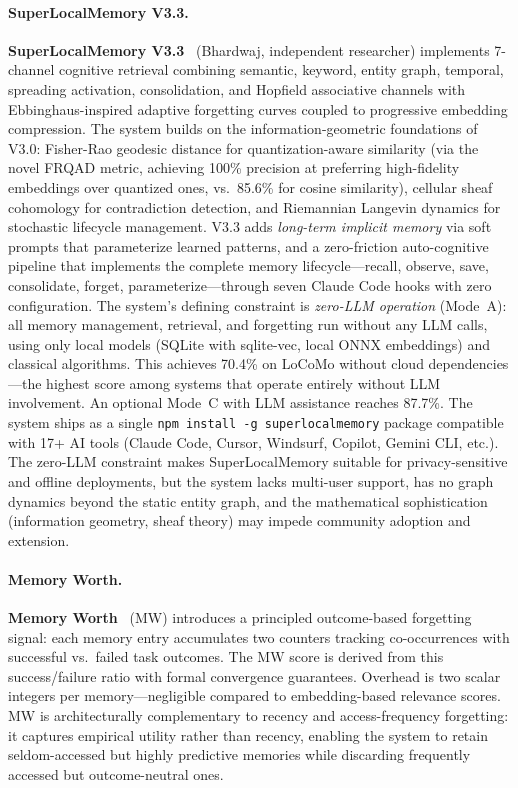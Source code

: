 \paragraph{SuperLocalMemory V3.3.}
\textbf{SuperLocalMemory V3.3}~\cite{superlocalmemory2026} (Bhardwaj,
independent researcher) implements 7-channel cognitive retrieval
combining semantic, keyword, entity graph, temporal, spreading
activation, consolidation, and Hopfield associative channels with
Ebbinghaus-inspired adaptive forgetting curves coupled to progressive
embedding compression.  The system builds on the information-geometric
foundations of V3.0: Fisher-Rao geodesic
distance for quantization-aware similarity (via the novel FRQAD metric,
achieving 100\% precision at preferring high-fidelity embeddings over
quantized ones, vs.\ 85.6\% for cosine similarity), cellular sheaf
cohomology for contradiction detection, and Riemannian Langevin dynamics
for stochastic lifecycle management.  V3.3 adds \emph{long-term implicit
memory} via soft prompts that parameterize learned patterns, and a
zero-friction auto-cognitive pipeline that implements the complete memory
lifecycle---recall, observe, save, consolidate, forget,
parameterize---through seven Claude Code hooks with zero configuration.
The system's defining constraint is \emph{zero-LLM operation} (Mode~A):
all memory management, retrieval, and forgetting run without any LLM
calls, using only local models (SQLite with sqlite-vec, local ONNX
embeddings) and classical algorithms.  This achieves 70.4\% on LoCoMo
without cloud dependencies---the highest score among systems that operate
entirely without LLM involvement.  An optional Mode~C with LLM
assistance reaches 87.7\%.  The system ships as a single
\texttt{npm install -g superlocalmemory} package compatible with 17+
AI tools (Claude Code, Cursor, Windsurf, Copilot, Gemini CLI, etc.).
The zero-LLM constraint makes SuperLocalMemory suitable for
privacy-sensitive and offline deployments, but the system lacks
multi-user support, has no graph dynamics beyond the static entity graph,
and the mathematical sophistication (information geometry, sheaf theory)
may impede community adoption and extension.

\paragraph{Memory Worth.}
\textbf{Memory Worth}~\cite{memoryworth2026} (MW) introduces a
principled outcome-based forgetting signal: each memory entry
accumulates two counters tracking co-occurrences with successful
vs.\ failed task outcomes.  The MW score is derived from this
success/failure ratio with formal convergence guarantees.  Overhead
is two scalar integers per memory---negligible compared to
embedding-based relevance scores.  MW is architecturally complementary
to recency and access-frequency forgetting: it captures empirical
utility rather than recency, enabling the system to retain
seldom-accessed but highly predictive memories while discarding
frequently accessed but outcome-neutral ones.

